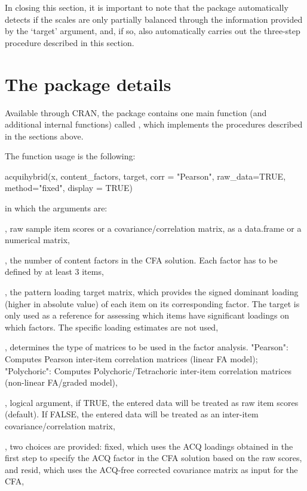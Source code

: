 In closing this section, it is important to note that the  package automatically detects if the scales are only partially balanced through the information provided by the ‘target’ argument, and, if so, also automatically carries out the three-step procedure described in this section.

\section{The  package details}

Available through CRAN, the  package contains one main function (and additional internal functions) called , which implements the procedures described in the sections above.

The function usage is the following:

\begin{example}
  acquihybrid(x, content_factors, target, corr = "Pearson", raw_data=TRUE,
  method="fixed", display = TRUE)
\end{example}

in which the arguments are:

, raw sample item scores or a covariance/correlation matrix, as a data.frame or a numerical matrix,

, the number of content factors in the CFA solution. Each factor has to be defined by at least 3 items,

, the pattern loading target matrix, which provides the signed dominant loading (higher in absolute value) of each item on its corresponding factor. The target is only used as a reference for assessing which items have significant loadings on which factors. The specific loading estimates are not used,

, determines the type of matrices to be used in the factor analysis. "Pearson": Computes Pearson inter-item correlation matrices (linear FA model); "Polychoric": Computes Polychoric/Tetrachoric inter-item correlation matrices (non-linear FA/graded model),

, logical argument, if TRUE, the entered data will be treated as raw item scores (default). If FALSE, the entered data will be treated as an inter-item covariance/correlation matrix,

, two choices are provided: fixed, which uses the ACQ loadings obtained in the first step to specify the ACQ factor in the CFA solution based on the raw scores, and resid, which uses the ACQ-free corrected covariance matrix as input for the CFA,

